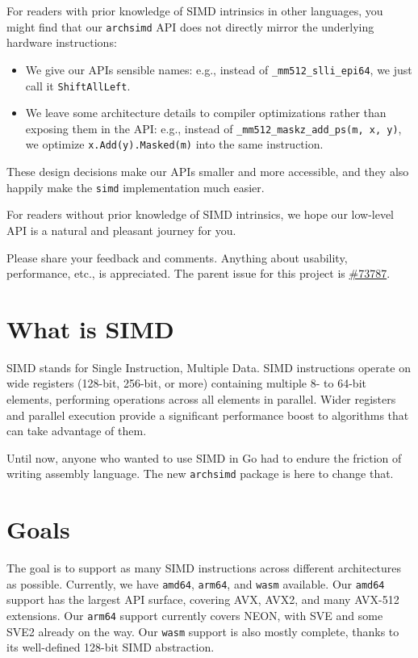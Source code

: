 \documentclass[11pt,a4paper]{article}
\begin{document}
For readers with prior knowledge of SIMD intrinsics in other languages, you might find that our \texttt{archsimd} API does not directly mirror the underlying hardware instructions:

\begin{itemize}
\item We give our APIs sensible names: e.g., instead of \texttt{_mm512_slli_epi64}, we just call it \texttt{ShiftAllLeft}.
\item We leave some architecture details to compiler optimizations rather than exposing them in the API: e.g., instead of \texttt{_mm512_maskz_add_ps(m, x, y)}, we optimize \texttt{x.Add(y).Masked(m)} into the same instruction.
\end{itemize}

These design decisions make our APIs smaller and more accessible, and they also happily make the \texttt{simd} implementation much easier.

For readers without prior knowledge of SIMD intrinsics, we hope our low-level API is a natural and pleasant journey for you.

Please share your feedback and comments. Anything about usability, performance, etc., is appreciated. The parent issue for this project is \href{https://go.dev/issue/73787}{\#73787}.

\section{What is SIMD}

SIMD stands for Single Instruction, Multiple Data. SIMD instructions operate on wide registers (128-bit, 256-bit, or more) containing multiple 8- to 64-bit elements, performing operations across all elements in parallel. Wider registers and parallel execution provide a significant performance boost to algorithms that can take advantage of them.

Until now, anyone who wanted to use SIMD in Go had to endure the friction of writing assembly language. The new \texttt{archsimd} package is here to change that.

\section{Goals}

The goal is to support as many SIMD instructions across different architectures as possible. Currently, we have \texttt{amd64}, \texttt{arm64}, and \texttt{wasm} available. Our \texttt{amd64} support has the largest API surface, covering AVX, AVX2, and many AVX-512 extensions. Our \texttt{arm64} support currently covers NEON, with SVE and some SVE2 already on the way. Our \texttt{wasm} support is also mostly complete, thanks to its well-defined 128-bit SIMD abstraction.
\end{document}
